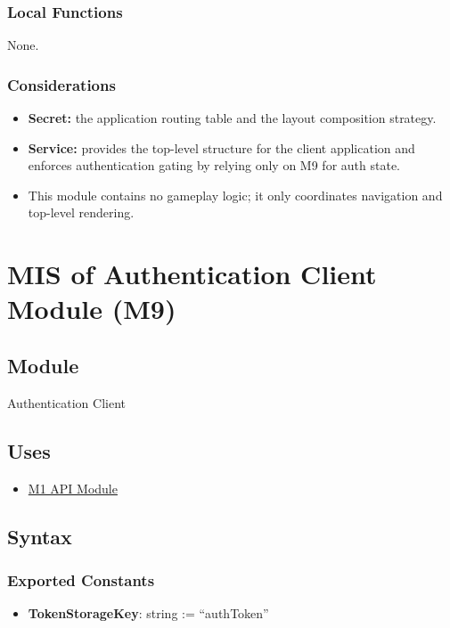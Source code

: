 \documentclass[12pt, titlepage]{article}
\begin{document}
\subsubsection{Local Functions}
None.

\subsubsection{Considerations}
\begin{itemize}
    \item \textbf{Secret:} the application routing table and the layout composition strategy.
    \item \textbf{Service:} provides the top-level structure for the client application and enforces authentication gating by relying only on M9 for auth state.
    \item This module contains no gameplay logic; it only coordinates navigation and top-level rendering.
\end{itemize}

\newpage
\section{MIS of Authentication Client Module (M9)}\label{sec:authentication-client-module}

\subsection{Module}
Authentication Client

\subsection{Uses}
\begin{itemize}
    \item \hyperref[sec:api-module]{M1 API Module}
\end{itemize}

\subsection{Syntax}

\subsubsection{Exported Constants}
\begin{itemize}
    \item \textbf{TokenStorageKey}: string := ``authToken''
\end{itemize}
\end{document}
